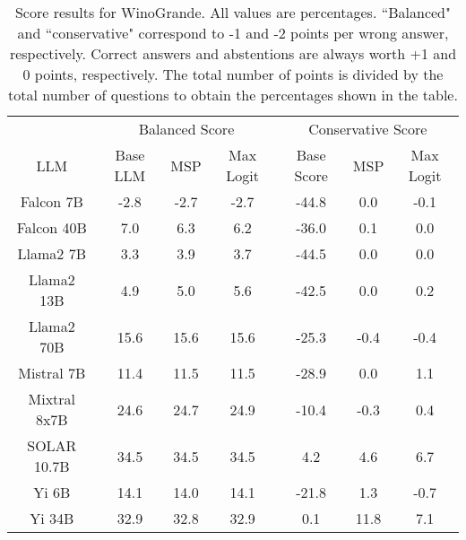 \renewcommand\arraystretch{1.2}
\begin{table*}
\centering
\begin{tabular}{c|c|c|c|c|c|c}
& \multicolumn{3}{c|}{Balanced Score} & \multicolumn{3}{c}{Conservative Score} \\ 
LLM & Base LLM & MSP & Max Logit & Base Score & MSP & Max Logit\\ \hline
Falcon 7B & -2.8 & -2.7 & -2.7 & -44.8 & 0.0 & -0.1\\
Falcon 40B & 7.0 & 6.3 & 6.2 & -36.0 & 0.1 & 0.0\\
Llama2 7B & 3.3 & 3.9 & 3.7 & -44.5 & 0.0 & 0.0\\
Llama2 13B & 4.9 & 5.0 & 5.6 & -42.5 & 0.0 & 0.2\\
Llama2 70B & 15.6 & 15.6 & 15.6 & -25.3 & -0.4 & -0.4\\
Mistral 7B & 11.4 & 11.5 & 11.5 & -28.9 & 0.0 & 1.1\\
Mixtral 8x7B & 24.6 & 24.7 & 24.9 & -10.4 & -0.3 & 0.4\\
SOLAR 10.7B & 34.5 & 34.5 & 34.5 & 4.2 & 4.6 & 6.7\\
Yi 6B & 14.1 & 14.0 & 14.1 & -21.8 & 1.3 & -0.7\\
Yi 34B & 32.9 & 32.8 & 32.9 & 0.1 & 11.8 & 7.1\\
\hline
\end{tabular}
\caption{Score results for WinoGrande. All values are percentages. ``Balanced" and ``conservative" correspond to -1 and -2 points per wrong answer, respectively. Correct answers and abstentions are always worth +1 and 0 points, respectively. The total number of points is divided by the total number of questions to obtain the percentages shown in the table.}
\label{tab:winogrande_score}
\end{table*}
